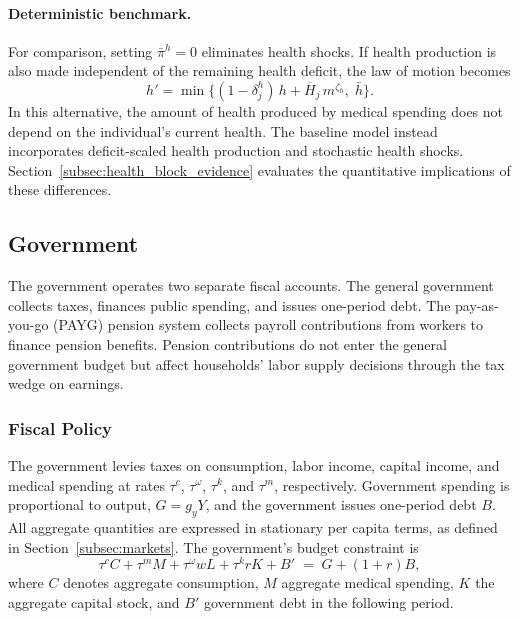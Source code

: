\documentclass[12pt,a4paper]{article}
\begin{document}
\paragraph{Deterministic benchmark.}
For comparison, setting $\bar\pi^h = 0$ eliminates health shocks. If health production is also made independent of the remaining health deficit, the law of motion becomes
\begin{equation}
\label{eq:health_formation}
h' = \min\bigl\{(1 - \delta_j^h)\, h + \overline{H}_j\, m^{\zeta_h},\; \bar h\bigr\}.
\end{equation}
In this alternative, the amount of health produced by medical spending does not depend on the individual's current health. The baseline model instead incorporates deficit-scaled health production and stochastic health shocks. Section~\ref{subsec:health_block_evidence} evaluates the quantitative implications of these differences.


\subsection{Government}
\label{subsec:government}

The government operates two separate fiscal accounts. The general government collects taxes, finances public spending, and issues one-period debt. The pay-as-you-go (PAYG) pension system collects payroll contributions from workers to finance pension benefits. Pension contributions do not enter the general government budget but affect households' labor supply decisions through the tax wedge on earnings.


\subsubsection{Fiscal Policy}
\label{subsubsec:fiscal}
The government levies taxes on consumption, labor income, capital income, and medical spending at rates $\tau^c$, $\tau^\omega$, $\tau^k$, and $\tau^m$, respectively. Government spending is proportional to output, $G = g_y Y$, and the government issues one-period debt $B$. All aggregate quantities are expressed in stationary per capita terms, as defined in Section~\ref{subsec:markets}. The government's budget constraint is
\begin{equation}
\label{eq:gov_budget}
\tau^c C + \tau^m M + \tau^\omega w L + \tau^k r K + B' \;=\; G + (1+r)B,
\end{equation}
where $C$ denotes aggregate consumption, $M$ aggregate medical spending, $K$ the aggregate capital stock, and $B'$ government debt in the following period. 
\end{document}
